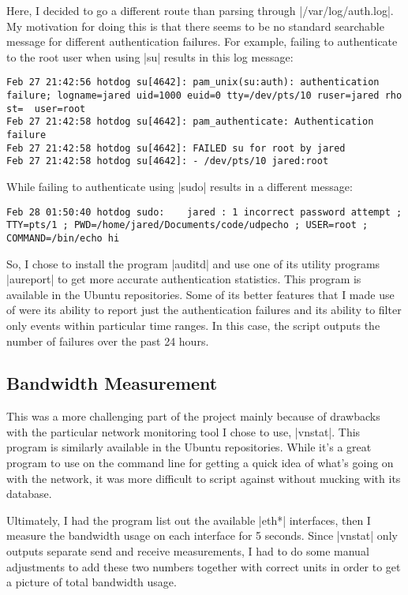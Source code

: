\documentclass{article}
\begin{document}
Here, I decided to go a different route than parsing through
|/var/log/auth.log|. My motivation for doing this is that there seems to be no
standard searchable message for different authentication failures. For
example, failing to authenticate to the root user when using |su| results in
this log message:

\begin{lstlisting}
Feb 27 21:42:56 hotdog su[4642]: pam_unix(su:auth): authentication failure; logname=jared uid=1000 euid=0 tty=/dev/pts/10 ruser=jared rho
st=  user=root
Feb 27 21:42:58 hotdog su[4642]: pam_authenticate: Authentication failure
Feb 27 21:42:58 hotdog su[4642]: FAILED su for root by jared
Feb 27 21:42:58 hotdog su[4642]: - /dev/pts/10 jared:root
\end{lstlisting}

While failing to authenticate using |sudo| results in a different message:

\begin{lstlisting}
Feb 28 01:50:40 hotdog sudo:    jared : 1 incorrect password attempt ; TTY=pts/1 ; PWD=/home/jared/Documents/code/udpecho ; USER=root ; COMMAND=/bin/echo hi
\end{lstlisting}

So, I chose to install the program |auditd| and use one of its utility
programs |aureport| to get more accurate authentication statistics. This
program is available in the Ubuntu repositories. Some of its better features
that I made use of were its ability to report just the authentication failures
and its ability to filter only events within particular time ranges. In this
case, the script outputs the number of failures over the past 24 hours.

\subsection{Bandwidth Measurement}

This was a more challenging part of the project mainly because of drawbacks
with the particular network monitoring tool I chose to use, |vnstat|. This
program is similarly available in the Ubuntu repositories. While it's a great
program to use on the command line for getting a quick idea of what's going on
with the network, it was more difficult to script against without mucking with
its database.

Ultimately, I had the program list out the available |eth*| interfaces, then I
measure the bandwidth usage on each interface for 5 seconds. Since |vnstat|
only outputs separate send and receive measurements, I had to do some manual
adjustments to add these two numbers together with correct units in order to
get a picture of total bandwidth usage.
\end{document}
